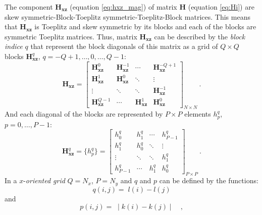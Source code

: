 The component $\mathbf{H_{xz}}$ (equation \ref{eq:hxz_mag}) of matrix $\mathbf{H}$ (equation \ref{eq:Hi}) are skew symmetric-Block-Toeplitz symmetric-Toeplitz-Block matrices. This means that $\mathbf{H_{xz}}$ is Toeplitz and skew symmetric by its blocks and each of the blocks are symmetric Toeplitz matrices. 
Thus, matrix $\mathbf{H_{xz}}$ can be described by the \textit{block indice} $q$ that represent the block diagonals of this matrix as a grid of $Q \times Q$ blocks $\mathbf{H}^{q}_\mathbf{xz}$, $q = -Q + 1, \dots, 0, \dots, Q - 1$:
\begin{equation}
	\mathbf{H_{xz}} = \begin{bmatrix}
		\mathbf{H}^{0}_\mathbf{xz}  & \mathbf{H}^{-1}_\mathbf{xz} & \cdots         & \mathbf{H}^{-Q+1}_\mathbf{xz} \\
		\mathbf{H}^{1}_\mathbf{xz}  & \mathbf{H}^{0}_\mathbf{xz} & \ddots         & \vdots           \\ 
		\vdots           & \ddots         & \ddots         & \mathbf{H}^{-1}_\mathbf{xz}   \\
		\mathbf{H}^{Q-1}_\mathbf{xz} & \cdots         & \mathbf{H}^{1}_\mathbf{xz} & \mathbf{H}^{0}_\mathbf{xz}                
	\end{bmatrix}_{N \times N} \: .
	\label{eq:BTTB_Hxz}
\end{equation}
And each diagonal of the blocks are represented by $P \times P$ elements $h^{q}_{p}$, $p = 0, \dots, P - 1$:
\begin{equation}
	\mathbf{H}^{q}_\mathbf{xz} =  \{h^{q}_p\} = \begin{bmatrix}
		h^{q}_{0}   & h^{q}_{1} & \cdots    & h^{q}_{P-1} \\
		h^{q}_{1}   & h^{q}_{0} & \ddots    & \vdots           \\ 
		\vdots      & \ddots    & \ddots    & h^{q}_{1}   \\
		h^{q}_{P-1} & \cdots    & h^{q}_{1} & h^{q}_{0}                 
	\end{bmatrix}_{P \times P} \: .
	\label{eq:Hxz_block}
\end{equation}
In a $x$-\textit{oriented grid} $Q = N_{x}$, $P = N_{y}$ and $q$ and $p$ can be defined by the functions:
\begin{equation}
	q(i, j) = \; l(i) - l(j) 
	\label{eq:Hxz-q-x-oriented}
\end{equation}
and
\begin{equation}
	p(i, j) = \; \mid k(i) - k(j) \mid \quad ,
	\label{eq:Hxz-p-x-oriented}
\end{equation}
